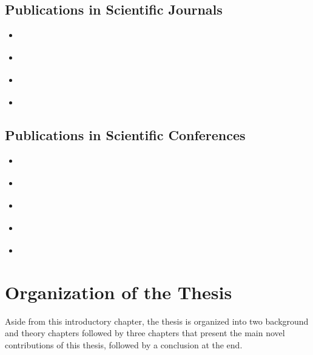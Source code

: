 \subsection{Publications in Scientific Journals}

\begin{itemize}
	\item \cite{bencevicTrainingPolarImage2021} 
	\item \cite{bencevicRecentProgressEpicardial2022} 
	\item \cite{bencevicSegmentthenSegmentContextPreservingCropBased2023a} 
	\item \cite{bencevicUnderstandingSkinColor2024} 
\end{itemize}

\subsection{Publications in Scientific Conferences}

\begin{itemize}
	\item \cite{bencevicEpicardialAdiposeTissue2021} 
	\item \cite{bencevicUsingPolarTransform2022a} 
	\item \cite{bencevicSelfsupervisedLearningMeans2022} 
	\item \cite{verchevalCounterfactualFunctionalConnectomes2023} 
	\item \cite{bencevicCropGuidedNeuralNetwork2024} 
\end{itemize}


\section{Organization of the Thesis}

Aside from this introductory chapter, the thesis is organized into two background and theory chapters followed by three chapters that present the main novel contributions of this thesis, followed by a conclusion at the end.


